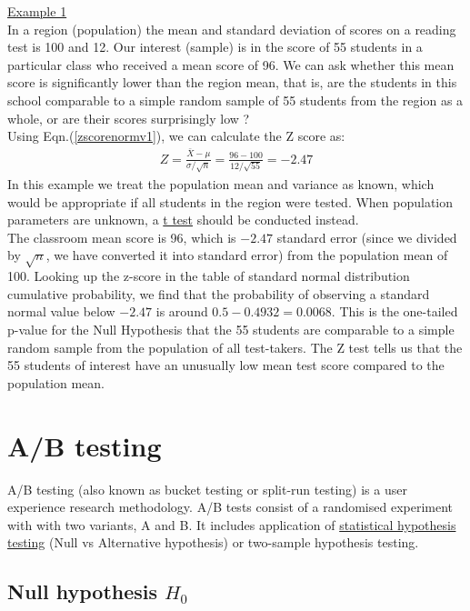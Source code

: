 \underline{Example 1}\\
In a region (population) the mean and standard deviation of scores on a reading test is 100 and 12. Our interest (sample) is in the score of 55 students in a particular class who received a mean score of 96. We can ask whether this mean score is significantly lower than the region mean, that is, are the students in this school comparable to a simple random sample of 55 students from the region as a whole, or are their scores surprisingly low ?\\

Using Eqn.(\ref{zscorenormv1}), we can calculate the Z score as:
\begin{eqnarray}
Z = \frac{\bar{X} - \mu}{\sigma/\sqrt{n}} = \frac{96-100}{12/\sqrt{55}} = -2.47
\end{eqnarray}
In this example we treat the population mean and variance as known, which would be appropriate if all students in the region were tested. When population parameters are unknown, a \underline{t test} should be conducted instead.\\

The classroom mean score is 96, which is $-2.47$ standard error (since we divided by $\sqrt{n}$, we have converted it into standard error) from the population mean of 100. Looking up the z-score in the table of standard normal distribution cumulative probability, we find that the probability of observing a standard normal value below $-2.47$ is around $0.5 - 0.4932 = 0.0068$. This is the one-tailed p-value for the Null Hypothesis that the 55 students are comparable to a simple random sample from the population of all test-takers. The Z test tells us that the 55 students of interest have an unusually low mean test score compared to the population mean. \\



\section{A/B testing}
\label{abtest}

A/B testing (also known as bucket testing or split-run testing) is a user experience research methodology. A/B tests consist of a randomised experiment with with two variants, A and B. It includes application of \underline{statistical hypothesis testing} (Null vs Alternative hypothesis) or two-sample hypothesis testing. \\


\subsection{Null hypothesis $H_0$}

